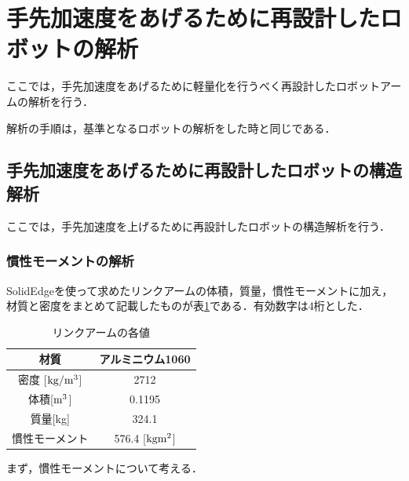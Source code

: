 \section{手先加速度をあげるために再設計したロボットの解析}\label{ux624bux5148ux52a0ux901fux5ea6ux3092ux3042ux3052ux308bux305fux3081ux306bux518dux8a2dux8a08ux3057ux305fux30edux30dcux30c3ux30c8ux306eux89e3ux6790}

ここでは，手先加速度をあげるために軽量化を行うべく再設計したロボットアームの解析を行う．

解析の手順は，基準となるロボットの解析をした時と同じである．

\subsection{手先加速度をあげるために再設計したロボットの構造解析}\label{ux624bux5148ux52a0ux901fux5ea6ux3092ux3042ux3052ux308bux305fux3081ux306bux518dux8a2dux8a08ux3057ux305fux30edux30dcux30c3ux30c8ux306eux69cbux9020ux89e3ux6790}

ここでは，手先加速度を上げるために再設計したロボットの構造解析を行う．

\subsubsection{慣性モーメントの解析}\label{ux6163ux6027ux30e2ux30fcux30e1ux30f3ux30c8ux306eux89e3ux6790}

SolidEdgeを使って求めたリンクアームの体積，質量，慣性モーメントに加え，材質と密度をまとめて記載したものが表\ref{light-robot-data}である．有効数字は4桁とした．

\begin{table}[htb]
\caption[]{リンクアームの各値}
  \begin{center}
    \begin{tabular}{|c|c|} \hline
      材質 & アルミニウム1060 \\ \hline
      密度 [$\rm kg/m^3$]& 2712 \\ \hline
      体積[$\rm m^3$] & 0.1195 \\ \hline
      質量[kg] & 324.1 \\ \hline
      慣性モーメント & 576.4 [$\rm kg m^2$] \\ \hline
    \end{tabular}
    \label{light-robot-data}
  \end{center}
\end{table}

まず，慣性モーメントについて考える．


